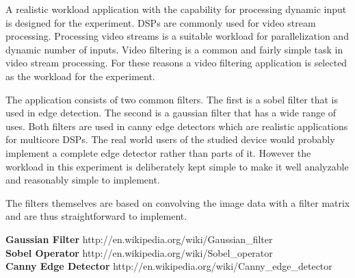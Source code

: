 A realistic workload application with the capability for processing dynamic input is designed for the experiment. DSPs are commonly used for video stream processing. Processing video streams is a suitable workload for parallelization and dynamic number of inputs. Video filtering is a common and fairly simple task in video stream processing. For these reasons a video filtering application is selected as the workload for the experiment.

The application consists of two common filters. The first is a sobel filter that is used in edge detection. The second is a gaussian filter that has a wide range of uses. Both filters are used in canny edge detectors which are realistic applications for multicore DSPs. The real world users of the studied device would probably implement a complete edge detector rather than parts of it. However the workload in this experiment is deliberately kept simple to make it well analyzable and reasonably simple to implement.

The filters themselves are based on convolving the image data with a filter matrix and are thus straightforward to implement.

\textbf{Gaussian Filter} http://en.wikipedia.org/wiki/Gaussian\_filter\\
\textbf{Sobel Operator} http://en.wikipedia.org/wiki/Sobel\_operator\\
\textbf{Canny Edge Detector} http://en.wikipedia.org/wiki/Canny\_edge\_detector\\